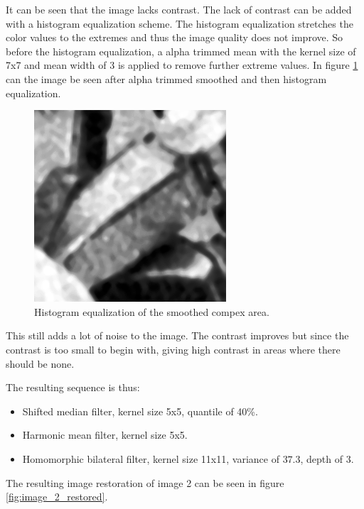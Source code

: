 It can be seen that the image lacks contrast.
The lack of contrast can be added with a histogram equalization scheme.
The histogram equalization stretches the color values to the extremes and thus the image quality does not improve.
So before the histogram equalization, a alpha trimmed mean with the kernel size of 7x7 and mean width of 3 is applied to remove further extreme values.
In figure \ref{fig:complex2_histeq_smoothed} can the image be seen after alpha trimmed smoothed and then histogram equalization.

\begin{figure}[H]
\centering
\includegraphics[width = \cutOutWidth]{graphics/complex2_histeq_smoothed.png}
\caption{Histogram equalization of the smoothed compex area.}
\label{fig:complex2_histeq_smoothed}
\end{figure}

This still adds a lot of noise to the image. 
The contrast improves but since the contrast is too small to begin with, giving high contrast in areas where there should be none.

The resulting sequence is thus:
\begin{itemize}
 \item Shifted median filter, kernel size 5x5, quantile of 40\%.
 \item Harmonic mean filter, kernel size 5x5.
 \item Homomorphic bilateral filter, kernel size 11x11, variance of $37.3$, depth of 3.
\end{itemize}
The resulting image restoration of image 2 can be seen in figure \ref{fig:image_2_restored}.


